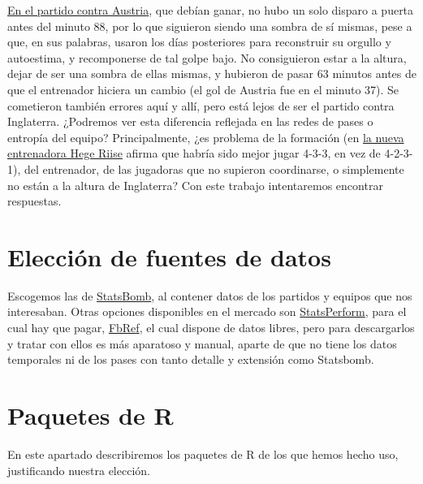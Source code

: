 \href{https://www.nrk.no/sport/norsk-fiasko-i-em_-_-en-varslet-katastrofe-1.16039578}{En el partido contra Austria},
que debían ganar, no hubo un solo disparo a puerta antes del minuto 88, por lo que siguieron siendo una sombra de sí 
mismas, pese a que, en sus palabras, usaron los días posteriores para reconstruir su orgullo y autoestima, y recomponerse 
de tal golpe bajo. No consiguieron estar a la altura, dejar de ser una sombra de ellas mismas, y hubieron de pasar 
63 minutos antes de que el entrenador hiciera un cambio (el gol de Austria fue en el minuto 37). Se cometieron también 
errores aquí y allí, pero está lejos de ser el partido contra Inglaterra. ¿Podremos ver esta diferencia reflejada 
en las redes de pases o entropía del equipo? Principalmente, ¿es problema de la formación 
(en \href{https://www.nrk.no/sport/reiten-ut-mot-sjogren-grep_-_-pa-tide-med-noko-nytt-1.16085631}{la nueva 
entrenadora Hege Riise} afirma que habría sido mejor jugar 4-3-3, en vez de 4-2-3-1), del entrenador, de las 
jugadoras que no supieron coordinarse, o simplemente no están a la altura de Inglaterra? Con este trabajo intentaremos 
encontrar respuestas. 

\section{Elección de fuentes de datos}
Escogemos las de \href{https://github.com/statsbomb/open-data}{StatsBomb}, al contener datos de los partidos y equipos que nos interesaban. Otras opciones disponibles en 
el mercado son \href{https://www.statsperform.com/}{StatsPerform}, para el cual hay que pagar, 
\href{https://fbref.com/en/}{FbRef}, el cual dispone de datos libres, pero para descargarlos y tratar con ellos 
es más aparatoso y manual, aparte de que no tiene los datos temporales ni de los pases con tanto detalle y 
extensión como Statsbomb.

\section{Paquetes de R}
En este apartado describiremos los paquetes de R de los que hemos hecho uso, justificando nuestra elección.

